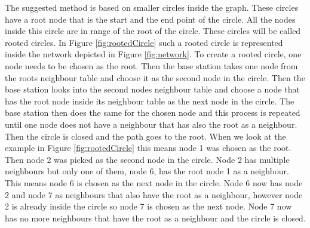 The suggested method is based on smaller circles inside the graph. These circles have a root node that is the start and the end point of the circle. All the nodes inside this circle are in range of the root of the circle. These circles will be called rooted circles. In Figure \ref{fig:rootedCircle} such a rooted circle is represented inside the network depicted in Figure \ref{fig:network}. To create a rooted circle, one node needs to be chosen as the root. Then the base station takes one node from the roots neighbour table and choose it as the second node in the circle.  Then the base station looks into the second nodes neighbour table and choose a node that has the root node inside its neighbour table as the next node in the circle. The base station then does the same for the chosen node and this process is repeated until one node does not have a neighbour that has also the root as a neighbour. Then the circle is closed and the path goes to the root. When we look at the example in Figure \ref{fig:rootedCircle} this means node 1 was chosen as the root. Then node 2 was picked as the second node in the circle. Node 2 has multiple neighbours but only one of them, node 6, has the root node 1 as a neighbour. This means node 6 is chosen as the next node in the circle. Node 6 now has node 2 and node 7 as neighbours that also have the root as a neighbour, however node 2 is already inside the circle so node 7 is chosen as the next node. Node 7 now has no more neighbours that have the root as a neighbour and the circle is closed.

